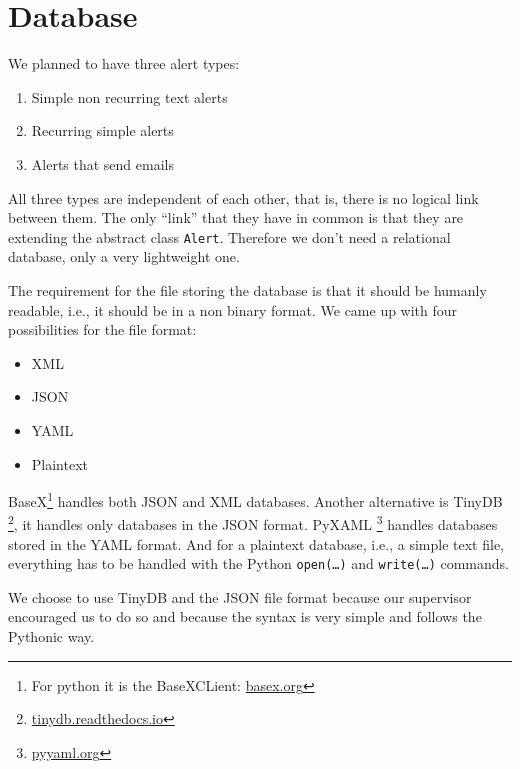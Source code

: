 \section{Database}

We planned to have three alert types:

\begin{enumerate}
    \item Simple non recurring text alerts
    \item Recurring simple alerts
    \item Alerts that send emails
\end{enumerate}

All three types are independent of each other, that is, there is no logical link
between them. The only ``link'' that they have in common is that they are
extending the abstract class \texttt{Alert}. Therefore we don't need a
relational database, only a very lightweight one.

The requirement for the file storing the database is that it should be humanly
readable, i.e., it should be in a non binary format. We came up with four
possibilities for the file format:

\begin{itemize}
    \item XML
    \item JSON
    \item YAML
    \item Plaintext
\end{itemize}

BaseX\footnote{For python it is the BaseXCLient:
\href{http://basex.org}{basex.org}} handles both JSON and XML databases. Another
alternative is TinyDB
\footnote{\href{http://tinydb.readthedocs.io}{tinydb.readthedocs.io}}, it
handles only databases in the JSON format. PyXAML
\footnote{\href{http://pyyaml.org}{pyyaml.org}} handles databases stored in the
YAML
format. And for a plaintext database, i.e., a simple text file, everything has
to be handled with the Python \texttt{open(\ldots)} and \texttt{write(\ldots)}
commands.

We choose to use TinyDB and the JSON file format because our supervisor
encouraged us to do so and because the syntax is very simple and follows the
Pythonic way.
